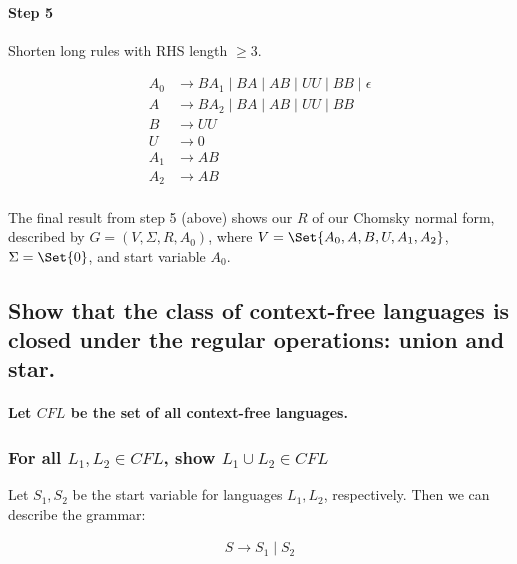 \documentclass{article}
\begin{document}
\paragraph{Step 5} Shorten long rules with RHS length $\geq 3$.

\begin{align*}
	A_0 & \longrightarrow BA_1 \;|\; BA \;|\; AB \;|\; UU \;|\; BB \;|\; \epsilon \\
	A   & \longrightarrow BA_2 \;|\; BA \;|\; AB \;|\; UU \;|\; BB                \\
	B   & \longrightarrow UU                                                      \\
	U   & \longrightarrow 0                                                       \\
	A_1 & \longrightarrow AB                                                      \\
	A_2 & \longrightarrow AB                                                      \\
\end{align*}

The final result from step 5 (above) shows our $R$ of our Chomsky normal form, described by $G = (V, \Sigma, R, A_0)$, where $V = \Set{A_0, A, B, U, A_1, A_2}$, $\Sigma = \Set{0}$, and start variable $A_0$.



\subsection{Show that the class of context-free languages is closed under the regular operations: union and star.}

\paragraph{Let $CFL$ be the set of all context-free languages.}

\subsubsection{For all $L_1, L_2 \in CFL$, show $L_1 \cup L_2 \in CFL$}

Let $S_1, S_2$ be the start variable for languages $L_1, L_2$, respectively.  Then we can describe the grammar:

\begin{align*}
	S \longrightarrow S_1 \;|\; S_2 \\
\end{align*}
\end{document}

